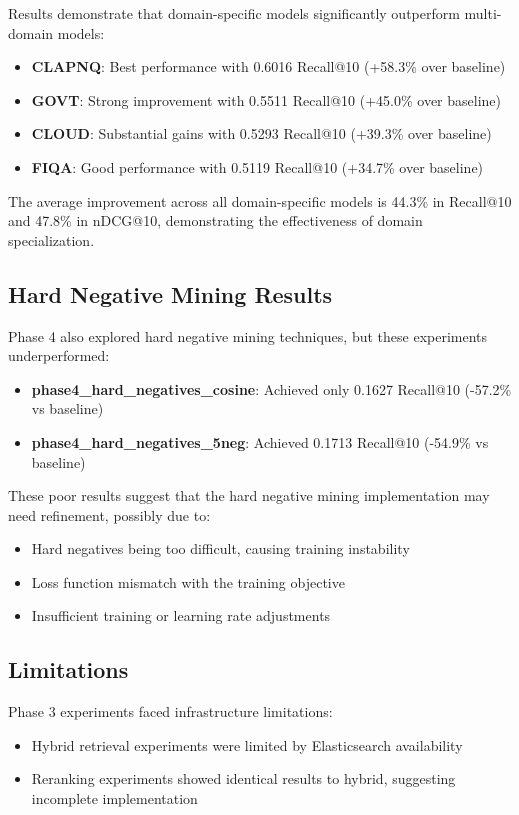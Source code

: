 \documentclass[conference]{IEEEtran}
\begin{document}
Results demonstrate that domain-specific models significantly outperform multi-domain models:
\begin{itemize}
    \item \textbf{CLAPNQ}: Best performance with 0.6016 Recall@10 (+58.3\% over baseline)
    \item \textbf{GOVT}: Strong improvement with 0.5511 Recall@10 (+45.0\% over baseline)
    \item \textbf{CLOUD}: Substantial gains with 0.5293 Recall@10 (+39.3\% over baseline)
    \item \textbf{FIQA}: Good performance with 0.5119 Recall@10 (+34.7\% over baseline)
\end{itemize}

The average improvement across all domain-specific models is 44.3\% in Recall@10 and 47.8\% in nDCG@10, demonstrating the effectiveness of domain specialization.

\subsection{Hard Negative Mining Results}

Phase 4 also explored hard negative mining techniques, but these experiments underperformed:
\begin{itemize}
    \item \textbf{phase4\_hard\_negatives\_cosine}: Achieved only 0.1627 Recall@10 (-57.2\% vs baseline)
    \item \textbf{phase4\_hard\_negatives\_5neg}: Achieved 0.1713 Recall@10 (-54.9\% vs baseline)
\end{itemize}

These poor results suggest that the hard negative mining implementation may need refinement, possibly due to:
\begin{itemize}
    \item Hard negatives being too difficult, causing training instability
    \item Loss function mismatch with the training objective
    \item Insufficient training or learning rate adjustments
\end{itemize}

\subsection{Limitations}

Phase 3 experiments faced infrastructure limitations:
\begin{itemize}
    \item Hybrid retrieval experiments were limited by Elasticsearch availability
    \item Reranking experiments showed identical results to hybrid, suggesting incomplete implementation
\end{itemize}
\end{document}
